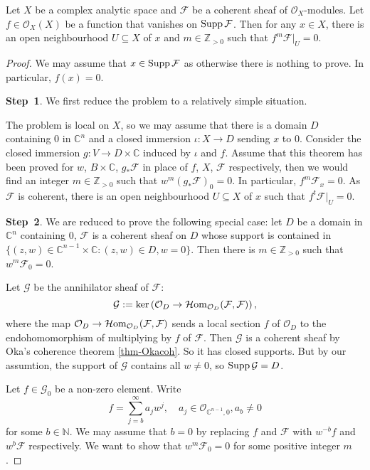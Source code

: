 \begin{thm}
    Let $X$ be a complex analytic space and $\mathcal{F}$ be a coherent sheaf of $\mathcal{O}_X$-modules. Let $f\in \mathcal{O}_X(X)$ be a function that vanishes on $\operatorname{Supp} \mathcal{F}$. Then for any $x\in X$, there is an open neighbourhood $U\subseteq X$ of $x$ and $m\in \mathbb{Z}_{>0}$ such that $f^m\mathcal{F}|_U=0$.
\end{thm}
\begin{proof}
    We may assume that $x\in \operatorname{Supp} \mathcal{F}$ as otherwise there is nothing to prove. In particular, $f(x)=0$.

    \textbf{Step~1}. We first reduce the problem to a relatively simple situation.

    The problem is local on $X$, so we may assume that there is a domain $D$ containing $0$ in $\mathbb{C}^n$ and a closed immersion $\iota:X\rightarrow D$ sending $x$ to $0$. Consider the closed immersion $g:V\rightarrow D\times \mathbb{C}$ induced by $\iota$ and $f$. Assume that this theorem has been proved for $w$, $B\times \mathbb{C}$, $g_*\mathcal{F}$ in place of $f$, $X$, $\mathcal{F}$ respectively, then we would find an integer $m\in \mathbb{Z}_{>0}$ such that $w^m(g_*\mathcal{F})_0=0$. In particular, $f^m\mathcal{F}_x=0$. As $\mathcal{F}$ is coherent, there is an open neighbourhood $U\subseteq X$ of $x$ such that $f^t\mathcal{F}|_U=0$.

    \textbf{Step~2}. We are reduced to prove the following special case: let $D$ be a domain in $\mathbb{C}^n$ containing $0$, $\mathcal{F}$ is a coherent sheaf on $D$ whose support is contained in $\{(z,w)\in \mathbb{C}^{n-1}\times \mathbb{C}:(z,w)\in D,w=0\}$. Then there is $m\in \mathbb{Z}_{>0}$ such that $w^m\mathcal{F}_0=0$.

    Let $\mathcal{G}$ be the annihilator sheaf of $\mathcal{F}$: 
    \[
       \mathcal{G}:=\ker \left(\mathcal{O}_D\rightarrow \operatorname{\mathcal{H}\mathrm{om}}_{\mathcal{O}_D}(\mathcal{F},\mathcal{F})\right),
    \]
    where the map $\mathcal{O}_D\rightarrow \operatorname{\mathcal{H}\mathrm{om}}_{\mathcal{O}_D}(\mathcal{F},\mathcal{F})$ sends a local section $f$ of $\mathcal{O}_D$ to the endohomomorphism of multiplying by $f$ of $\mathcal{F}$.
    Then $\mathcal{G}$ is a coherent sheaf by Oka's coherence theorem \cref{thm-Okacoh}. So it has closed supports. But by our assumtion, the support of $\mathcal{G}$ contains all $w\neq 0$, so $\operatorname{Supp} \mathcal{G}=D$.

    Let $f\in \mathcal{G}_0$ be a non-zero element. Write
    \[
      f=\sum_{j=b}^{\infty}a_jw^j,\quad a_j\in \mathcal{O}_{\mathbb{C}^{n-1},0},a_b\neq 0
    \]
    for some $b\in \mathbb{N}$.
    We may assume that $b=0$ by replacing $f$ and $\mathcal{F}$ with $w^{-b}f$ and  $w^b\mathcal{F}$ respectively. We want to show that $w^m\mathcal{F}_0=0$ for some positive integer $m$. 
    

\end{proof}
